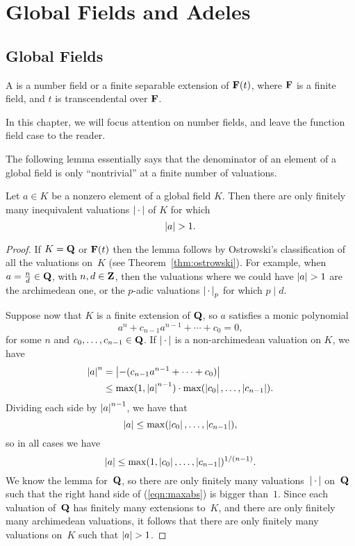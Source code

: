 \chapter{Global Fields and Adeles}
\section{Global Fields}\label{sec:global_fields}
\begin{definition}
  A  is a number field or a finite separable
  extension of $\mathbf{F}(t)$, where $\mathbf{F}$ is a finite field, and $t$ is
  transcendental over $\mathbf{F}$.
\end{definition}

In this chapter, we will focus attention on number fields, and leave
the function field case to the reader.

The following lemma essentially says that the denominator of an
element of a global field is only ``nontrivial'' at a finite number of
valuations.
\begin{lemma}\label{lem:absbig}
Let $a\in K$ be a nonzero element of a global field $K$.  Then
there are only finitely many inequivalent valuations $\left|\,\cdot\,\right|$
of $K$ for which 
$$
  \left|a\right| > 1.
$$
\end{lemma}
\begin{proof}
  If $K=\mathbf{Q}$ or $\mathbf{F}(t)$ then the lemma follows by Ostrowski's
  classification of all the valuations on~$K$ (see 
Theorem~\ref{thm:ostrowski}). For example,
  when $a=\frac{n}{d}\in\mathbf{Q}$, with $n,d\in \mathbf{Z}$, then the valuations
  where we could have $\abs{a}>1$ are the archimedean one, or the
  $p$-adic valuations $\left|\,\cdot\,\right|_p$ for which $p\mid d$.

Suppose now that $K$ is a finite extension of $\mathbf{Q}$, so
$a$ satisfies a monic polynomial
$$
  a^n + c_{n-1} a^{n-1} + \cdots + c_0 = 0,
$$
for some $n$ and $c_0,\ldots, c_{n-1}\in\mathbf{Q}$.
If $\left|\,\cdot\,\right|$ is a non-archimedean valuation on $K$, we have
\begin{align*}
  \left|a\right|^n &= \left|-(c_{n-1} a^{n-1} + \cdots + c_0)\right| \\
      &\leq \max(1,\left|a\right|^{n-1})\cdot \max(\left|c_0\right|,\ldots,\left|c_{n-1}\right|).
\end{align*}
Dividing each side by $\left|a\right|^{n-1}$, we have
that
$$
   \left|a\right| \leq \max(\left|c_0\right|,\ldots,\left|c_{n-1}\right|),
$$
so in all cases we have
\begin{equation}\label{eqn:maxabs}
   \left|a\right| \leq \max(1, \left|c_0\right|,
   \ldots,\left|c_{n-1}\right|)^{1/(n-1)}.
\end{equation}
We know the lemma for~$\mathbf{Q}$, so there are only finitely many
valuations~$\left|\,\cdot\,\right|$ on~$\mathbf{Q}$ such that the right hand side of
(\ref{eqn:maxabs}) is bigger than~$1$.  Since each valuation of~$\mathbf{Q}$
has finitely many extensions to~$K$, and there are only finitely many
archimedean valuations, it follows that there are only finitely many
valuations on~$K$ such that $\abs{a}>1$.
\end{proof}

